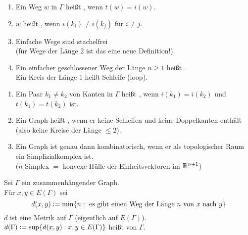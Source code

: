 \documentclass[a4paper, 10pt]{report}
\begin{document}
\begin{DefBem}
\begin{enumerate}
  \item Ein Weg $w \textrm{ in } \Gamma$ heißt , wenn $t(w) = i(w)$.
  \item $w$ heißt , wenn $i(k_i) \not= i(k_j)$ für $i \not= j$.
  \item Einfache Wege sind stachelfrei \\
  (für Wege der Länge 2 ist das eine neue Definition!).
  \item Ein einfacher geschlossener Weg der Länge $n \ge 1$ heißt .\\
  Ein Kreis der Länge 1 heißt Schleife (loop).\\
\end{enumerate}
\end{DefBem}

\begin{DefBem}
\begin{enumerate}
  \item Ein Paar $k_1 \not= k_2$ von Kanten in $\Gamma$ heißt , wenn
  $i(k_1) = i(k_2)$ und $t(k_1) = t(k_2)$ ist.
  \item Ein Graph heißt , wenn er keine Schleifen und keine
  Doppelkanten enthält (also keine Kreise der Länge $\le 2$).
  \item Ein Graph ist genau dann kombinatorisch, wenn er als topologischer Raum
  ein Simplizialkomplex ist.\\
  ($n$-Simplex $=$ konvexe Hülle der Einheitsvektoren im $\mathbb{R}^{n+1}$)
\end{enumerate}
\end{DefBem}

\begin{DefBem}
Sei $\Gamma$ ein zusammenhängender Graph.\\
Für $x,y \in E(\Gamma)$ sei
$$d(x,y) \mathrel{\mathop:}= \min\{n: \textrm{ es gibt einen Weg der Länge } n \textrm{ von 
} x \textrm{ nach } y \}$$
$d$ ist eine Metrik auf $\Gamma$ (eigentlich auf $E(\Gamma)$).\\
$d(\Gamma) \mathrel{\mathop:}= \sup\{d(x,y): x,y \in E(\Gamma) \}$ heißt  von $\Gamma$.
\end{DefBem}
\end{document}
